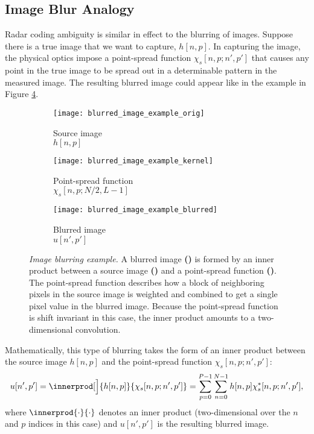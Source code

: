\subsection{Image Blur Analogy}
Radar coding ambiguity is similar in effect to the blurring of images. Suppose there is a true image that we want to capture, $h[n,p]$. In capturing the image, the physical optics impose a point-spread function $\chi_s[n,p;n',p']$ that causes any point in the true image to be spread out in a determinable pattern in the measured image. The resulting blurred image could appear like in the example in Figure \ref{fig:image_blurring}.
\begin{figure}[tpb]
 \centering
 \begin{subfigure}[b]{0.35\textwidth}
  \centering
  \texttt{[image: blurred\_image\_example\_orig]}
  \caption{Source image\\$h[n,p]$}
  \label{fig:source_image}
 \end{subfigure}
 \hfill
 \begin{subfigure}[b][0.35\textwidth+2\baselineskip]{0.26\textwidth}
  \centering
  \vfill
  \texttt{[image: blurred\_image\_example\_kernel]}%
  \captionsetup{justification=centering}
  \vfill
  \caption{Point-spread function\\$\chi_s[n,p;N/2,L-1]$}
  \label{fig:point_spread_function}
 \end{subfigure}
 \hfill
 \begin{subfigure}[b]{0.35\textwidth}
  \centering
  \texttt{[image: blurred\_image\_example\_blurred]}
  \caption{Blurred image\\$u[n',p']$}
  \label{fig:blurred_image}
 \end{subfigure}
 \caption[Image blurring example]{\emph{Image blurring example.} A blurred image \textbf{()} is formed by an inner product between a source image \textbf{()} and a point-spread function \textbf{()}. The point-spread function describes how a block of neighboring pixels in the source image is weighted and combined to get a single pixel value in the blurred image. Because the point-spread function is shift invariant in this case, the inner product amounts to a two-dimensional convolution.}
 \label{fig:image_blurring}
\end{figure}%
Mathematically, this type of blurring takes the form of an inner product between the source image $h[n,p]$ and the point-spread function $\chi_s[n,p;n',p']$:
\begin{equation}\label{eq:image_blurring}
 u[n',p'] = \innerprod[\Big]{h[n,p]}{\chi_s[n,p;n',p']} = \sum_{p=0}^{P-1} \sum_{n=0}^{N-1} h[n,p] \chi_s^*[n,p;n',p'],
\end{equation}
where $\innerprod{\cdot}{\cdot}$ denotes an inner product (two-dimensional over the $n$ and $p$ indices in this case) and $u[n',p']$ is the resulting blurred image.

